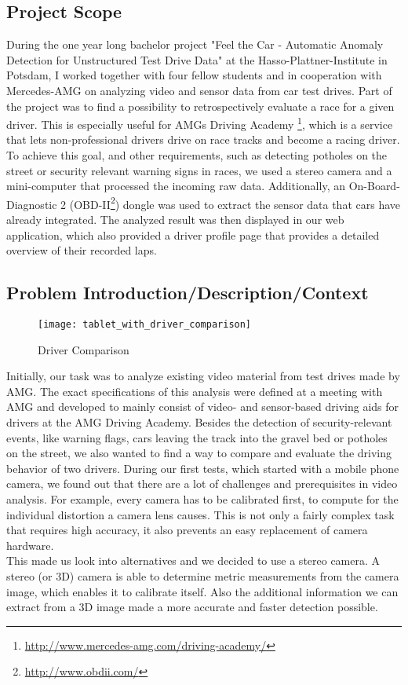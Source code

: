 \subsection{Project Scope}
During the one year long bachelor project "Feel the Car - Automatic A\-no\-ma\-ly Detection for Unstructured Test Drive Data" at the Hasso-Plattner-Institute in Potsdam, I worked together with four fellow students and in cooperation with Mercedes-AMG on analyzing video and sensor data from car test drives.
Part of the project was to find a possibility to retrospectively evaluate a race for a given driver. This is especially useful for AMGs Driving Academy \footnote{\url{http://www.mercedes-amg.com/driving-academy/}}, which is a service that lets non-professional drivers drive on race tracks and become a racing driver.\\
To achieve this goal, and other requirements, such as detecting potholes on the street or security relevant warning signs in races, we used a stereo camera and a mini-computer that processed the incoming raw data.
Additionally, an On-Board-Diagnostic 2 (OBD-II\footnote{\url{http://www.obdii.com/}}) dongle was used to extract the sensor data that cars have already integrated.
The analyzed result was then displayed in our web application, which also provided a driver profile page that provides a detailed overview of their recorded laps.
\clearpage

\subsection{Problem Introduction/Description/Context}

\begin{figure}[!ht]
	\centering
	\texttt{[image: tablet\_with\_driver\_comparison]}
	\caption{Driver Comparison}
	\label{fig:comparison_with_overlay}
\end{figure}

Initially, our task was to analyze existing video material from test drives made by AMG. The exact specifications of this analysis were defined at a meeting with AMG and developed to mainly consist of video- and sensor-based driving aids for drivers at the AMG Driving Academy. Besides the detection of security-relevant events, like warning flags, cars leaving the track into the gravel bed or potholes on the street, we also wanted to find a way to compare and evaluate the driving behavior of two drivers.
During our first tests, which started with a mobile phone camera, we found out that there are a lot of challenges and prerequisites in video analysis. For example, every camera has to be calibrated first, to compute for the individual distortion a camera lens causes. This is not only a fairly complex task that requires high accuracy, it also prevents an easy replacement of camera hardware.\\
This made us look into alternatives and we decided to use a stereo camera. A stereo (or 3D) camera is able to determine metric measurements from the camera image, which enables it to calibrate itself. Also the additional information we can extract from a 3D image made a more accurate and faster detection possible.\\

